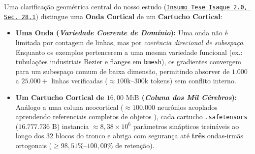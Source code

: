 \documentclass[10pt,a4paper]{article}
\begin{document}
Uma clarifica\c{c}\~ao geom\'etrica central do nosso estudo (\href{https://drive.google.com/file/d/1-i60d5UqJBOJQYLSr-ErZxecFeYSi4zX/view?usp=drivesdk}{\texttt{Insumo Tese Isaque 2.0, Sec.\ 28.1}}) distingue uma \textbf{Onda Cortical} de um \textbf{Cartucho Cortical}:
\begin{itemize}
  \item \textbf{Uma Onda (\textit{Variedade Coerente de Dom\'inio}):} Uma onda n\~ao \'e limitada por contagem de linhas, mas por \textit{coer\^encia direcional de subespa\c{c}o}. Enquanto os exemplos pertencerem a uma mesma variedade funcional (ex.: tubula\c{c}\~oes industriais Bezier e flanges em \texttt{bmesh}), os gradientes convergem para um subespa\c{c}o comum de baixa dimens\~ao, permitindo absorver de $1.000$ a $25.000+$ linhas verificadas ($\approx 100\text{k}\text{--}300\text{k}$ tokens) sem conflito interno.
  \item \textbf{Um Cartucho Cortical de $16,00\text{ MiB}$ (\textit{Coluna dos Mil C\'erebros}):} An\'alogo a uma coluna neocortical ($\approx 100.000$ neur\^onios acoplados aprendendo referenciais completos de objetos \cite{hawkins2019grid,clay2024monty}), cada cartucho \texttt{.safetensors} ($16.777.736\text{ B}$) instancia $\approx 8,38 \times 10^6$ par\^ametros sin\'apticos trein\'aveis ao longo dos $32$ blocos do tronco e abriga com seguran\c{c}a at\'e \textbf{tr\^es} ondas-irm\~as ortogonais ($\ge 98,51\%\text{--}100,00\%$ de reten\c{c}\~ao).
\end{itemize}
\end{document}

